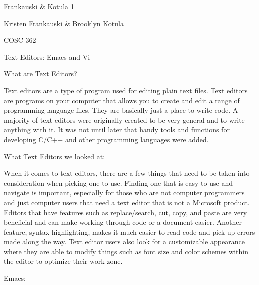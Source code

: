 \documentclass{article} %
\begin{document}


\noindent Frankauski \& Kotula 1

\noindent Kristen Frankauski \& Brooklyn Kotula

\noindent COSC 362 

\noindent 

\noindent Text Editors:  Emacs and Vi

\noindent 

\noindent 

\noindent What are Text Editors?

\noindent 

\noindent 

\noindent Text editors are a type of program used for editing plain text files. Text editors are programs on your computer that allows you to create and edit a range of programming language files. They are basically just a place to write code. A majority of text editors were originally created to be very general and to write anything with it. It was not until later that handy tools and functions for developing C/C++ and other programming languages were added.

\noindent 

\noindent What Text Editors we looked at:

\noindent 

\noindent 

\noindent When it comes to text editors, there are a few things that need to be taken into consideration when picking one to use. Finding one that is easy to use and navigate is important, especially for those who are not computer programmers and just computer users that need a text editor that is not a Microsoft product. Editors that have features such as replace/search, cut, copy, and paste are very beneficial and can make working through code or a document easier. Another feature, syntax highlighting, makes it much easier to read code and pick up errors made along the way. Text editor users also look for a customizable appearance where they are able to modify things such as font size and color schemes within the editor to optimize their work zone.

\noindent 

\noindent 

\noindent Emacs:

\noindent 
\end{document}
